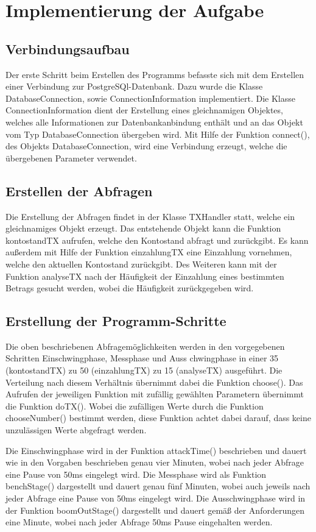 \section{Implementierung der Aufgabe}

\subsection{Verbindungsaufbau}
Der erste Schritt beim Erstellen des Programms befasste sich mit dem Erstellen
einer Verbindung zur PostgreSQl-Datenbank. Dazu wurde die Klasse
DatabaseConnection, sowie ConnectionInformation implementiert. Die Klasse
ConnectionInformation dient der Erstellung eines gleichnamigen Objektes,
welches alle Informationen zur Datenbankanbindung enthält und an das Objekt vom
Typ DatabaseConnection  übergeben wird. Mit Hilfe der Funktion connect(), des
Objekts DatabaseConnection, wird eine Verbindung erzeugt, welche die
übergebenen Parameter verwendet.

\subsection{Erstellen der Abfragen}
Die Erstellung der Abfragen findet in der Klasse TXHandler statt, welche ein
gleichnamiges Objekt erzeugt. Das entstehende Objekt kann die Funktion
kontostandTX aufrufen, welche den Kontostand abfragt und zurückgibt. Es kann
außerdem mit Hilfe der Funktion einzahlungTX eine Einzahlung vornehmen, welche
den aktuellen Kontostand zurückgibt. Des Weiteren kann mit der Funktion
analyseTX nach der Häufigkeit der Einzahlung eines bestimmten Betrags gesucht
werden, wobei die Häufigkeit zurückgegeben wird.

\subsection{Erstellung der Programm-Schritte}
Die oben beschriebenen Abfragemöglichkeiten werden in den vorgegebenen
Schritten Einschwingphase, Messphase und Auss chwingphase in einer 35
(kontostandTX) zu 50 (einzahlungTX) zu 15 (analyseTX) ausgeführt. Die Verteilung
nach diesem Verhältnis übernimmt dabei die Funktion choose(). Das Aufrufen der
jeweiligen Funktion mit zufällig gewählten Parametern übernimmt die Funktion
doTX(). Wobei die zufälligen Werte durch die Funktion chooseNumber() bestimmt
werden, diese Funktion achtet dabei darauf, dass keine unzulässigen Werte
abgefragt werden.

Die Einschwingphase wird in der Funktion attackTime() beschrieben und dauert
wie in den Vorgaben beschrieben genau vier Minuten, wobei nach jeder Abfrage
eine Pause von 50ms eingelegt wird. Die Messphase wird als Funktion
benchStage() dargestellt und dauert genau fünf Minuten, wobei auch jeweils nach
jeder Abfrage eine Pause von 50ms eingelegt wird. Die Ausschwingphase wird in
der Funktion boomOutStage() dargestellt und dauert gemäß der Anforderungen eine
Minute, wobei nach jeder Abfrage 50ms Pause eingehalten werden.

